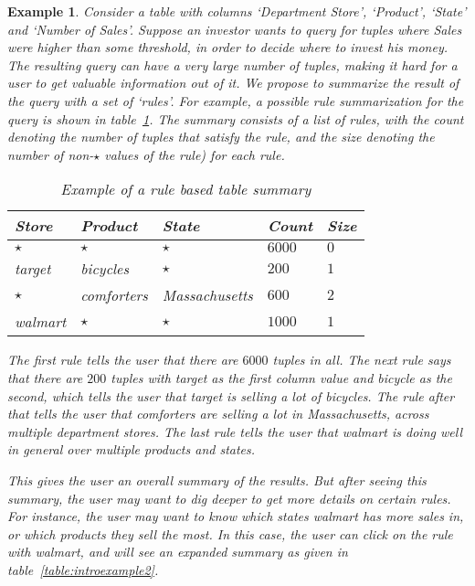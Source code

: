 \documentclass{sig-alternate}
\newtheorem{example}[definition]{Example}
\begin{document}
\begin{example}\label{ex:introexample}
Consider a table with columns `Department Store', `Product', `State' and `Number of Sales'. Suppose an investor wants to query for tuples where Sales were higher than some threshold, in order to decide where to invest his money. The resulting query can have a very large number of tuples, making it hard for a user to get valuable information out of it. We propose to summarize the result of the query with a set of `rules'. For example, a possible rule summarization for the query is shown in table~\ref{table:introexample}. The summary consists of a list of \textit{rules}, with the \textit{count} denoting the number of tuples that satisfy the rule, and the \textit{size} denoting the number of non-$\star$ values of the rule) for each rule.

\begin{table}
\centering
\begin{tabular}{| l | l | l | l | l |}
\hline Store & Product & State & Count & Size \\
\hline
$\star$ & $\star$ & $\star$ & $6000$ & $0$ \\ \hline
target & bicycles & $\star$ & $200$ & $1$ \\ \hline
$\star$ & comforters & Massachusetts & $600$ & $2$ \\ \hline
walmart & $\star$ & $\star$ & $1000$ & $1$ \\ \hline
\end{tabular}
\caption{Example of a rule based table summary \label{table:introexample}}
\end{table}

The first rule tells the user that there are $6000$ tuples in all. 
The next rule says that there are $200$ tuples with target as the first column value and bicycle as the second, which tells the user that target is selling a lot of bicycles. The rule after that tells the user that comforters are selling a lot in Massachusetts, across multiple department stores. The last rule tells the user that walmart is doing well in general over multiple products and states. 

This gives the user an overall summary of the results. But after seeing this summary, the user may want to dig deeper to get more details on certain rules. For instance, the user may want to know which states walmart has more sales in, or which products they sell the most. In this case, the user can click on the rule with walmart, and will see an expanded summary as given in table~\ref{table:introexample2}. 


\end{example}
\end{document}
